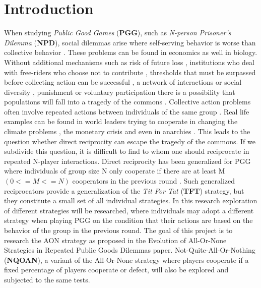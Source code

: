 \documentclass[letterpaper]{article}
\begin{document}
\section{Introduction}
When studying \textit{Public Good Games}  (\textbf{PGG}), such as \textit{N-person Prisoner's Dilemma}  (\textbf{NPD}), social dilemmas arise where self-serving behavior is worse than collective behavior \citep{kollock1998social}. These problems can be found in economics as well in biology.
Without additional mechanisms such as risk of future loss \citep{santos2011risk}, institutions who deal with free-riders who choose not to contribute \citep{vasconcelos2013bottom,sigmund2010social}, thresholds that must be surpassed before collecting action can be successful \citep{pacheco2011evolutionary}, a network of interactions or social diversity \citep{wang2013interdependent,santos2008social}, punishment \citep{fehr2002altruistic,brandt2006punishing} or voluntary participation \citep{hauert2002volunteering} there is a possibility that populations will fall into a tragedy of the commons \citep{hardin1968tragedy}.
Collective action problems often involve repeated actions between individuals of the same group \citep{boyd1988evolution}. Real life examples can be found in world leaders trying to cooperate in changing the climate problems \citep{milinski2008collective,barrett2012climate}, the monetary crisis \citep{jacquet2001economic} and even in anarchies \citep{axelrod1985achieving}. This leads to the question whether direct reciprocity can escape the tragedy of the commons. If we subdivide this question, it is difficult to find to whom one should reciprocate in repeated N-player interactions. Direct reciprocity has been generalized for PGG where individuals of group size N only cooperate if there are at least M $(0<=M<=N)$ cooperators in the previous round \citep{van2012emergence,kurokawa2009emergence}. Such generalized reciprocators provide a generalization of the \textit{Tit For Tat}  (\textbf{TFT}) strategy, but they constitute a small set of all individual strategies.
In this research exploration of different strategies will be researched, where individuals may adopt a different strategy when playing PGG on the condition that their actions are based on the behavior of the group in the previous round.
The goal of this project is to research the AON strategy as proposed in the Evolution of All-Or-None Strategies in Repeated Public
Goods Dilemmas \citep{project} paper. Not-Quite-All-Or-Nothing (\textbf{NQOAN}), a variant of the All-Or-None strategy where players cooperate if a fixed percentage of players cooperate or defect, will also be explored and subjected to the same tests.
\end{document}
